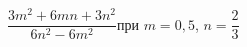 \begin{ex}[type=expr_calc]
	\begin{condition}
		\( \dfrac{3m^2+6mn+3n^2}{6n^2-6m^2} \)\hspace{0.5cm}при \( m=0,5 \), \( n=\dfrac{2}{3} \)
	\end{condition}
\end{ex}